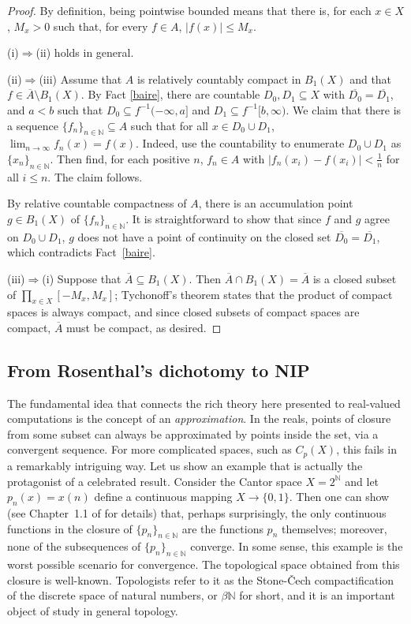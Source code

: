 \documentclass[psamsfonts]{amsart}
\theoremstyle{definition}
\theoremstyle{remark}
\numberwithin{equation}{section}
\begin{document}
\begin{proof}
    By definition, being pointwise bounded means that there is, for each $x\in X$, $M_x>0$ such that, for every $f\in A$, $|f(x)|\leq M_x$.

    (i)$\Rightarrow$(ii) holds in general. 

    (ii)$\Rightarrow$(iii) Assume that $A$ is relatively countably compact in $B_1(X)$ and that $f\in\overline A\setminus B_1(X)$. By Fact \ref{baire}, there are countable $D_0,D_1\subseteq X$ with $\overline {D_0}=\overline{D_1}$, and $a<b$ such that $D_0\subseteq f^{-1}(-\infty,a]$ and $D_1\subseteq f^{-1}[b,\infty)$. We claim that there is a sequence $\{f_n\}_{n\in\mathbb N}\subseteq A$ such that for all $x\in D_0\cup D_1$, $\lim_{n\to\infty}f_n(x)=f(x)$. Indeed, use the countability to enumerate $D_0\cup D_1$ as $\{x_n\}_{n\in\mathbb N}$. Then find, for each positive $n$, $f_n\in A$ with $|f_n(x_i)-f(x_i)|<\frac1n$ for all $i\leq n$. The claim follows.

    By relative countable compactness of $A$, there is an accumulation point $g\in B_1(X)$ of $\{f_n\}_{n\in\mathbb N}$. It is straightforward to show that since $f$ and $g$ agree on $D_0\cup D_1$, $g$ does not have a point of continuity on the closed set $\overline{D_0}=\overline{D_1}$, which contradicts Fact~\ref{baire}.

    (iii)$\Rightarrow$(i) Suppose that $\overline A\subseteq B_1(X)$. Then $\overline{A}\cap B_1(X)=\overline A$ is a closed subset of $\prod_{x\in X}[-M_x,M_x]$; Tychonoff's theorem states that the product of compact spaces is always compact, and since closed subsets of compact spaces are compact, $\overline A$ must be compact, as desired.
\end{proof}

\subsection{From Rosenthal's dichotomy to NIP}

The fundamental idea that connects the rich theory here presented to real-valued computations is the concept of an \emph{approximation}. In the reals, points of closure from some subset can always be approximated by points inside the set, via a convergent sequence. For more complicated spaces, such as $C_p(X)$, this fails in a remarkably intriguing way. Let us show an example that is actually the protagonist of a celebrated result. Consider the Cantor space $X=2^\mathbb N$ and let $p_n(x)=x(n)$ define a continuous mapping $X\to\{0,1\}$. Then one can show (see Chapter~1.1 of \cite{Todorcevic_1997_TopicsTop} for details) that, perhaps surprisingly, the only continuous functions in the closure of $\{p_n\}_{n\in\mathbb N}$ are the functions $p_n$ themselves; moreover, none of the subsequences of $\{p_n\}_{n\in\mathbb N}$ converge. In some sense, this example is the worst possible scenario for convergence. The topological space obtained from this closure is well-known. Topologists refer to it as the Stone-Čech compactification of the discrete space of natural numbers, or $\beta\mathbb N$ for short, and it is an important object of study in general topology.
\end{document}
